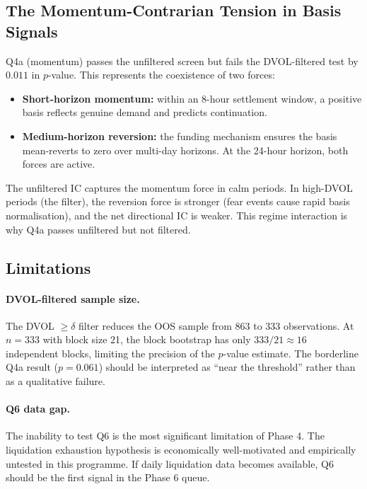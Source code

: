 \documentclass[12pt, a4paper]{article}
\theoremstyle{plain}
\theoremstyle{definition}
\begin{document}
\subsection{The Momentum-Contrarian Tension in Basis Signals}

Q4a (momentum) passes the unfiltered screen but fails the DVOL-filtered
test by $0.011$ in $p$-value.  This represents the coexistence of two
forces:

\begin{itemize}
  \item \textbf{Short-horizon momentum:} within an 8-hour settlement window,
        a positive basis reflects genuine demand and predicts continuation.
  \item \textbf{Medium-horizon reversion:} the funding mechanism ensures
        the basis mean-reverts to zero over multi-day horizons.  At the
        24-hour horizon, both forces are active.
\end{itemize}

The unfiltered IC captures the momentum force in calm periods.  In
high-DVOL periods (the filter), the reversion force is stronger (fear
events cause rapid basis normalisation), and the net directional IC is
weaker.  This regime interaction is why Q4a passes unfiltered but not
filtered.

\subsection{Limitations}

\paragraph{DVOL-filtered sample size.}
The DVOL $\geq \delta$ filter reduces the OOS sample from 863 to 333
observations.  At $n = 333$ with block size 21, the block bootstrap
has only $333/21 \approx 16$ independent blocks, limiting the
precision of the $p$-value estimate.  The borderline Q4a result
($p = 0.061$) should be interpreted as ``near the threshold'' rather
than as a qualitative failure.

\paragraph{Q6 data gap.}
The inability to test Q6 is the most significant limitation of Phase 4.
The liquidation exhaustion hypothesis is economically well-motivated and
empirically untested in this programme.  If daily liquidation data becomes
available, Q6 should be the first signal in the Phase 6 queue.
\end{document}
